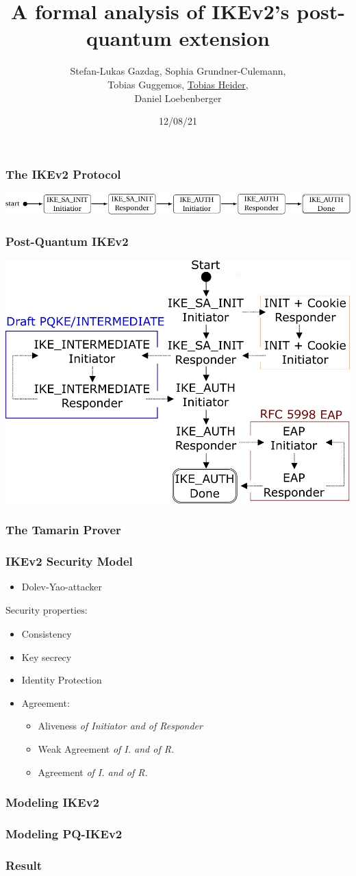 \documentclass{beamer}
\title{A formal analysis of IKEv2's post-quantum extension}
\author{Stefan-Lukas Gazdag, Sophia Grundner-Culemann,\\
    Tobias Guggemos, \underline{Tobias Heider},\\
    Daniel Loebenberger}
\institute{ACSAC2021}
\date{12/08/21}
\begin{document}
\begin{frame}
	\titlepage
\end{frame}

\begin{frame}
\frametitle{The IKEv2 Protocol}
\includegraphics[width=\textwidth]{ike-state-machine.pdf}
\end{frame}

\begin{frame}
\frametitle{Post-Quantum IKEv2}
\includegraphics[width=\textwidth]{statemachine.pdf}
\end{frame}

\begin{frame}
\frametitle{The Tamarin Prover}
\end{frame}

\begin{frame}
\frametitle{IKEv2 Security Model}
\begin{itemize}
	\item Dolev-Yao-attacker
\end{itemize}
\pause
\bigskip
$\underline{\text{Security properties:}}$              
\pause
\begin{itemize}	
	\item Consistency
	\pause
	\item Key secrecy
	\pause
	\item Identity Protection
	\pause
	\item Agreement: \smallskip
	\pause
	\begin{itemize}
		\item Aliveness \textit{of Initiator and of Responder} 
		\pause        
		\item Weak Agreement \textit{of I. and of R.}
		\pause
		\item Agreement\textit{ of I. and of R.}		
	\end{itemize}
	
\end{itemize}
\end{frame}

\begin{frame}
\frametitle{Modeling IKEv2}
\end{frame}

\begin{frame}
	\frametitle{Modeling PQ-IKEv2}
\end{frame}

\begin{frame}
\frametitle{Result}
\end{frame}
\end{document}
